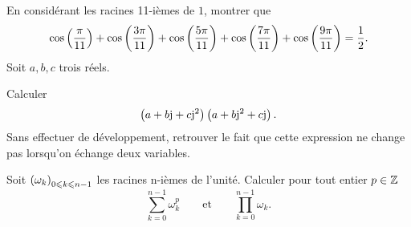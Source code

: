 \documentclass{magnolia}
\begin{document}
\begin{questions}
\question En considérant les racines 11-ièmes de $1$, montrer que
  $$\cos\left(\frac{\pi}{11}\right)+\cos\left(\frac{3\pi}{11}\right)+\cos\left(\frac{5\pi}{11}\right)+
    \cos\left(\frac{7\pi}{11}\right)+\cos\left(\frac{9\pi}{11}\right)=\frac{1}{2}.$$
\question Soit $a,b,c$ trois réels.
  \begin{questions}
  \question Calculer
    $$\left(a+b{\rm j}+c{\rm j}^2\right)\left(a+b{\rm j}^2+c{\rm j}\right).$$
  \question Sans effectuer de développement, retrouver le fait que cette
    expression ne change pas lorsqu'on échange deux variables.
  \end{questions}
\question Soit $\left(\omega_k\right)_{0\leqslant k\leqslant n-1}$ les racines n-ièmes de l'unité.
  Calculer pour tout entier $p\in\mathbb{Z}$
  $$\sum_{k=0}^{n-1} \omega_k^p \qquad \text{et} \qquad
    \prod_{k=0}^{n-1} \omega_k.$$
\end{questions}
\end{document}
